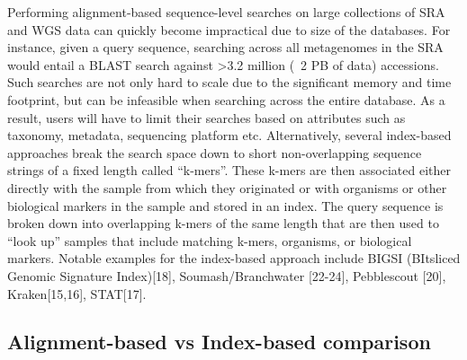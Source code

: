 Performing alignment-based sequence-level searches on large collections of SRA and WGS data can quickly become impractical due to size of the databases. For instance, given a query sequence, searching across all metagenomes in the SRA would entail a BLAST search against >3.2 million (~2 PB of data) accessions.  Such searches are not only hard to scale due to the significant memory and time footprint, but can be infeasible when searching across the entire database. As a result, users will have to limit their searches based on attributes such as taxonomy, metadata, sequencing platform etc. Alternatively, several index-based approaches break the search space down to short non-overlapping sequence strings of a fixed length called “k-mers”. These k-mers are then associated either directly with the sample from which they originated or with organisms or other biological markers in the sample and stored in an index. The query sequence is broken down into overlapping k-mers of the same length that are then used to “look up” samples that include matching k-mers, organisms, or biological markers. Notable examples for the index-based approach include BIGSI (BItsliced Genomic Signature Index)[18], Soumash/Branchwater [22-24], Pebblescout [20], Kraken[15,16], STAT[17].

\subsection{Alignment-based vs Index-based comparison}
\label{sec:compareSeqMethods}

